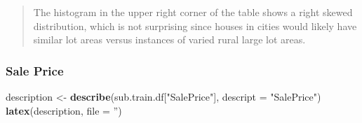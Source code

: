 \documentclass[]{article}
\newenvironment{Shaded}{\begin{snugshade}}{\end{snugshade}}
\newcommand{\KeywordTok}[1]{\textcolor[rgb]{0.13,0.29,0.53}{\textbf{{#1}}}}
\newcommand{\DataTypeTok}[1]{\textcolor[rgb]{0.13,0.29,0.53}{{#1}}}
\newcommand{\StringTok}[1]{\textcolor[rgb]{0.31,0.60,0.02}{{#1}}}
\newcommand{\NormalTok}[1]{{#1}}
\begin{document}
\begin{quote}
The histogram in the upper right corner of the table shows a right
skewed distribution, which is not surprising since houses in cities
would likely have similar lot areas versus instances of varied rural
large lot areas.
\end{quote}

\subsubsection{Sale Price}\label{sale-price}

\begin{Shaded}
\begin{Highlighting}[]
\NormalTok{description <-}\StringTok{ }\KeywordTok{describe}\NormalTok{(sub.train.df[}\StringTok{"SalePrice"}\NormalTok{], }\DataTypeTok{descript =} \StringTok{"SalePrice"}\NormalTok{)}
\KeywordTok{latex}\NormalTok{(description, }\DataTypeTok{file =} \StringTok{''}\NormalTok{)}
\end{Highlighting}
\end{Shaded}
\end{document}
